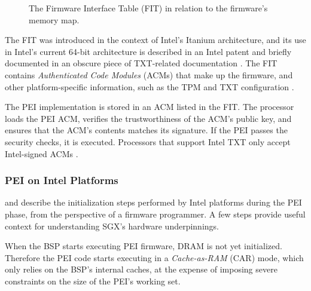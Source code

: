 \begin{figure}[hbt]
  \caption{
    The Firmware Interface Table (FIT) in relation to the firmware's memory
    map.
  }
  \label{fig:firmware_fit}
\end{figure}

The FIT \cite{qureshi2006fit} was introduced in the context of Intel's Itanium
architecture, and its use in Intel's current 64-bit architecture is described
in an Intel patent \cite{datta2013acm} and briefly documented in an obscure
piece of TXT-related documentation \cite{intel2010txtlab}. The FIT contains
\textit{Authenticated Code Modules} (ACMs) that make up the firmware, and
other platform-specific information, such as the TPM and TXT configuration
\cite{intel2010txtlab}.

The PEI implementation is stored in an ACM listed in the FIT. The processor
loads the PEI ACM, verifies the trustworthiness of the ACM's public key, and
ensures that the ACM's contents matches its signature. If the PEI passes the
security checks, it is executed. Processors that support Intel TXT only accept
Intel-signed ACMs \cite[p. 92]{futral2013servertxt}.


\subsubsection{PEI on Intel Platforms}
\label{sec:uefi_pei_details}

\cite{intel2010booting} and \cite{coreboot2015manual} describe the
initialization steps performed by Intel platforms during the PEI phase, from
the perspective of a firmware programmer. A few steps provide useful context
for understanding SGX's hardware underpinnings.


When the BSP starts executing PEI firmware, DRAM is not yet initialized.
Therefore the PEI code starts executing in a \textit{Cache-as-RAM} (CAR) mode,
which only relies on the BSP's internal caches, at the expense of imposing
severe constraints on the size of the PEI's working set.

